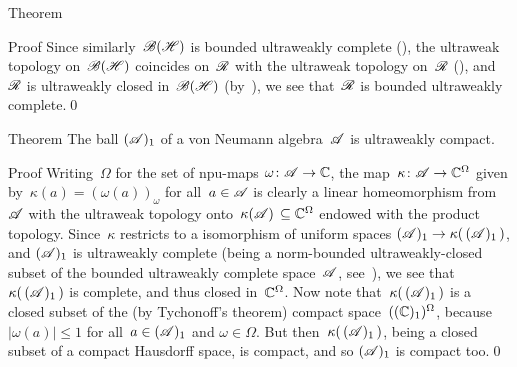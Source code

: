 \documentclass[a]{subfiles}
\begin{document}
\begin{parsec}
\begin{point}[vn-complete]{Theorem}
\begin{point}{Proof}
Since similarly~$\mathscr{B}(\mathscr{H})$
is bounded ultraweakly complete (),
the ultraweak topology on~$\mathscr{B}(\mathscr{H})$
coincides on~$\mathscr{R}$ with the ultraweak topology on~$\mathscr{R}$
(),
and~$\mathscr{R}$ is ultraweakly closed
in~$\mathscr{B}(\mathscr{H})$
(by~),
we see that~$\mathscr{R}$ is bounded ultraweakly complete.\qed
\end{point}
\end{point}
\begin{point}{Theorem}%
The ball $(\mathscr{A})_1$
of a von Neumann algebra~$\mathscr{A}$ is ultraweakly compact.
\begin{point}{Proof}%
Writing~$\Omega$ for
the set of npu-maps $\omega\colon \mathscr{A}\to\mathbb{C}$,
the map~$\kappa\colon \mathscr{A}\to \mathbb{C}^\Omega$
given by~$\kappa(a)=(\omega(a))_\omega$ for all~$a\in\mathscr{A}$
is clearly a linear homeomorphism from~$\mathscr{A}$ with the  ultraweak topology 
onto~$\kappa(\mathscr{A})\,\subseteq \mathbb{C}^\Omega$ endowed
with the product topology.
Since~$\kappa$ restricts
to a isomorphism of uniform spaces
$(\mathscr{A})_1\to \kappa(\,(\mathscr{A})_1\,)$,
and $(\mathscr{A})_1$ is ultraweakly complete 
(being a norm-bounded ultraweakly-closed
subset of the bounded ultraweakly complete space~$\mathscr{A}$,
see~),
we see that $\kappa(\,(\mathscr{A})_1\,)$
is complete,
and thus closed in~$\mathbb{C}^\Omega$.
Now note that~$\kappa(\,(\mathscr{A})_1\,)$ is a closed subset 
of the (by Tychonoff's theorem) compact
space~$((\mathbb{C})_1)^\Omega$, 
because $\left|\omega(a)\right|\leq 1$ for all~$a\in(\mathscr{A})_1$
and $\omega\in\Omega$.
But then~$\kappa(\,(\mathscr{A})_1\,)$,
being a closed subset of a compact Hausdorff space,
is compact,
and so $(\mathscr{A})_1$ is compact too.\qed
\end{point}
\end{point}
\end{parsec}
\end{document}

